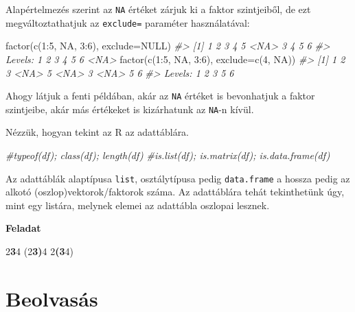 \documentclass[
]{book}
\newenvironment{Shaded}{\begin{snugshade}}{\end{snugshade}}
\newcommand{\AttributeTok}[1]{\textcolor[rgb]{0.77,0.63,0.00}{#1}}
\newcommand{\CommentTok}[1]{\textcolor[rgb]{0.56,0.35,0.01}{\textit{#1}}}
\newcommand{\ConstantTok}[1]{\textcolor[rgb]{0.00,0.00,0.00}{#1}}
\newcommand{\DecValTok}[1]{\textcolor[rgb]{0.00,0.00,0.81}{#1}}
\newcommand{\FunctionTok}[1]{\textcolor[rgb]{0.00,0.00,0.00}{#1}}
\newcommand{\NormalTok}[1]{#1}
\newcommand{\SpecialCharTok}[1]{\textcolor[rgb]{0.00,0.00,0.00}{#1}}
\begin{document}
Alapértelmezés szerint az \texttt{NA} értéket zárjuk ki a faktor szintjeiből, de ezt megváltoztathatjuk az \texttt{exclude=} paraméter használatával:

\begin{Shaded}
\begin{Highlighting}[]
\FunctionTok{factor}\NormalTok{(}\FunctionTok{c}\NormalTok{(}\DecValTok{1}\SpecialCharTok{:}\DecValTok{5}\NormalTok{, }\ConstantTok{NA}\NormalTok{, }\DecValTok{3}\SpecialCharTok{:}\DecValTok{6}\NormalTok{), }\AttributeTok{exclude=}\ConstantTok{NULL}\NormalTok{)}
\CommentTok{\#\textgreater{}  [1] 1    2    3    4    5    \textless{}NA\textgreater{} 3    4    5    6   }
\CommentTok{\#\textgreater{} Levels: 1 2 3 4 5 6 \textless{}NA\textgreater{}}
\FunctionTok{factor}\NormalTok{(}\FunctionTok{c}\NormalTok{(}\DecValTok{1}\SpecialCharTok{:}\DecValTok{5}\NormalTok{, }\ConstantTok{NA}\NormalTok{, }\DecValTok{3}\SpecialCharTok{:}\DecValTok{6}\NormalTok{), }\AttributeTok{exclude=}\FunctionTok{c}\NormalTok{(}\DecValTok{4}\NormalTok{, }\ConstantTok{NA}\NormalTok{))}
\CommentTok{\#\textgreater{}  [1] 1    2    3    \textless{}NA\textgreater{} 5    \textless{}NA\textgreater{} 3    \textless{}NA\textgreater{} 5    6   }
\CommentTok{\#\textgreater{} Levels: 1 2 3 5 6}
\end{Highlighting}
\end{Shaded}

Ahogy látjuk a fenti példában, akár az \texttt{NA} értéket is bevonhatjuk a faktor szintjeibe, akár más értékeket is kizárhatunk az \texttt{NA}-n kívül.

Nézzük, hogyan tekint az R az adattáblára.

\begin{Shaded}
\begin{Highlighting}[]
\CommentTok{\#typeof(df); class(df); length(df)}
\CommentTok{\#is.list(df); is.matrix(df); is.data.frame(df)}
\end{Highlighting}
\end{Shaded}

Az adattáblák alaptípusa \texttt{list}, osztálytípusa pedig \texttt{data.frame} a hossza pedig az alkotó (oszlop)vektorok/faktorok száma. Az adattáblára tehát tekinthetünk úgy, mint egy listára, melynek elemei az adattábla oszlopai lesznek.

\textbf{Feladat}

2\textbf{3}4
(2\textbf{3)}4
2\textbf{(3}4)

\hypertarget{beolvasas}{%
\chapter{Beolvasás}\label{beolvasas}}
\end{document}
